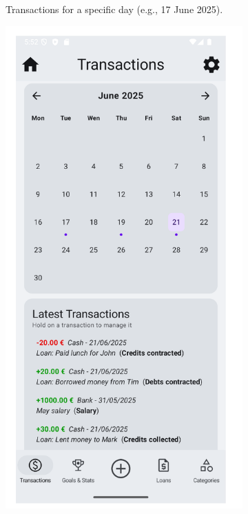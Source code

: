 \documentclass[a4paper,12pt]{article}
\begin{document}
\begin{figure}[H]
\begin{subfigure}[b]{0.23\textwidth}
        \caption{Transactions for a specific day (e.g., 17 June 2025).}
        \label{fig:transactions_specific_day}
    \end{subfigure}
    \hfill
    \begin{subfigure}[b]{0.23\textwidth}
        \includegraphics[width=\textwidth]{transactions.png}

\end{subfigure}
\end{figure}
\end{document}
